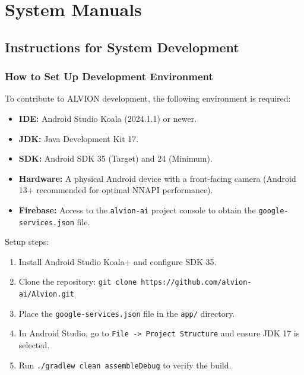 \documentclass[11pt]{report}
\begin{document}
\clearpage

\chapter{System Manuals}

\section{Instructions for System Development}

\subsection{How to Set Up Development Environment}
To contribute to ALVION development, the following environment is required:
\begin{itemize}
    \item \textbf{IDE:} Android Studio Koala (2024.1.1) or newer.
    \item \textbf{JDK:} Java Development Kit 17.
    \item \textbf{SDK:} Android SDK 35 (Target) and 24 (Minimum).
    \item \textbf{Hardware:} A physical Android device with a front-facing camera (Android 13+ recommended for optimal NNAPI performance).
    \item \textbf{Firebase:} Access to the \texttt{alvion-ai} project console to obtain the \texttt{google-services.json} file.
\end{itemize}

Setup steps:
\begin{enumerate}
    \item Install Android Studio Koala+ and configure SDK 35.
    \item Clone the repository: \texttt{git clone https://github.com/alvion-ai/Alvion.git}
    \item Place the \texttt{google-services.json} file in the \texttt{app/} directory.
    \item In Android Studio, go to \texttt{File -> Project Structure} and ensure JDK 17 is selected.
    \item Run \texttt{./gradlew clean assembleDebug} to verify the build.
\end{enumerate}
\end{document}

